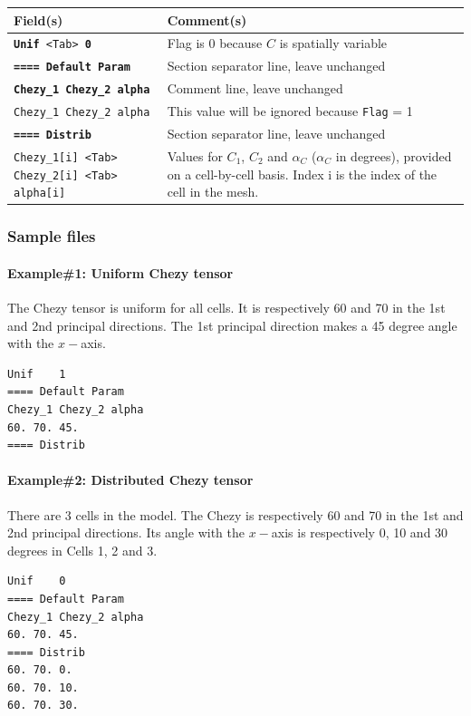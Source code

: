     \begin{tabular}{p{6cm} | p{9cm}}
    \hline
    Field(s) & Comment(s) \\
    \hline  \hline
    \texttt{\textbf{Unif} <Tab> \textbf{0}} & Flag is 0 because $C$ is spatially variable \\ \hline
    \texttt{\textbf{==== Default Param}} & Section separator line, leave unchanged \\  \hline
    \texttt{\textbf{Chezy\_1 Chezy\_2 alpha}} & Comment line, leave unchanged \\  \hline
    \texttt{Chezy\_1 Chezy\_2 alpha}     & This value will be ignored because \texttt{Flag} = 1 \\ \hline
    \texttt{\textbf{==== Distrib}} & Section separator line, leave unchanged \\  \hline
    \texttt{Chezy\_1[i] <Tab> Chezy\_2[i] <Tab> alpha[i]}      & Values for $C_1$, $C_2$ and $\alpha_C$ ($\alpha_C$ in degrees), provided on a cell-by-cell basis. Index i is the index of the cell in the mesh.  \\ \hline
    \end{tabular}
%
\subsubsection{Sample files}
%
\paragraph*{Example\#1: Uniform Chezy tensor}
The Chezy tensor is uniform for all cells. It is respectively 60 and 70 in the 1st and 2nd principal directions. The 1st principal direction makes a 45 degree angle with the $x-$axis.
\begin{verbatim}
Unif	1
==== Default Param
Chezy_1	Chezy_2	alpha
60.	70.	45.
==== Distrib
\end{verbatim}
%
\paragraph*{Example\#2: Distributed Chezy tensor}
There are 3 cells in the model. The Chezy is respectively 60 and 70 in the 1st and 2nd principal directions. Its angle with the $x-$axis is respectively 0, 10 and 30 degrees in Cells 1, 2 and 3.
\begin{verbatim}
Unif	0
==== Default Param
Chezy_1	Chezy_2	alpha
60.	70.	45.
==== Distrib
60.	70.	0.
60.	70.	10.
60.	70.	30.
\end{verbatim}